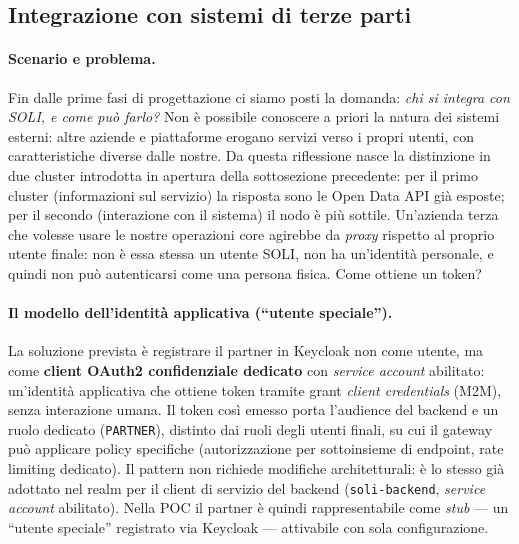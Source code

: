 \documentclass[11pt,a4paper]{article}
\begin{document}
\subsection{Integrazione con sistemi di terze parti}
\label{subsec:third-party}

\paragraph{Scenario e problema.} Fin dalle prime fasi di progettazione ci siamo posti la domanda: \emph{chi si integra con SOLI, e come pu\`o farlo?} Non \`e possibile conoscere a priori la natura dei sistemi esterni: altre aziende e piattaforme erogano servizi verso i propri utenti, con caratteristiche diverse dalle nostre. Da questa riflessione nasce la distinzione in due cluster introdotta in apertura della sottosezione precedente: per il primo cluster (informazioni sul servizio) la risposta sono le Open Data API gi\`a esposte; per il secondo (interazione con il sistema) il nodo \`e pi\`u sottile. Un'azienda terza che volesse usare le nostre operazioni core agirebbe da \emph{proxy} rispetto al proprio utente finale: non \`e essa stessa un utente SOLI, non ha un'identit\`a personale, e quindi non pu\`o autenticarsi come una persona fisica. Come ottiene un token?

\paragraph{Il modello dell'identit\`a applicativa (``utente speciale'').} La soluzione prevista \`e registrare il partner in Keycloak non come utente, ma come \textbf{client OAuth2 confidenziale dedicato} con \emph{service account} abilitato: un'identit\`a applicativa che ottiene token tramite grant \emph{client credentials} (M2M), senza interazione umana. Il token cos\`i emesso porta l'audience del backend e un ruolo dedicato (\texttt{PARTNER}), distinto dai ruoli degli utenti finali, su cui il gateway pu\`o applicare policy specifiche (autorizzazione per sottoinsieme di endpoint, rate limiting dedicato). Il pattern non richiede modifiche architetturali: \`e lo stesso gi\`a adottato nel realm per il client di servizio del backend (\texttt{soli-backend}, \emph{service account} abilitato). Nella POC il partner \`e quindi rappresentabile come \emph{stub} --- un ``utente speciale'' registrato via Keycloak --- attivabile con sola configurazione.
\end{document}
